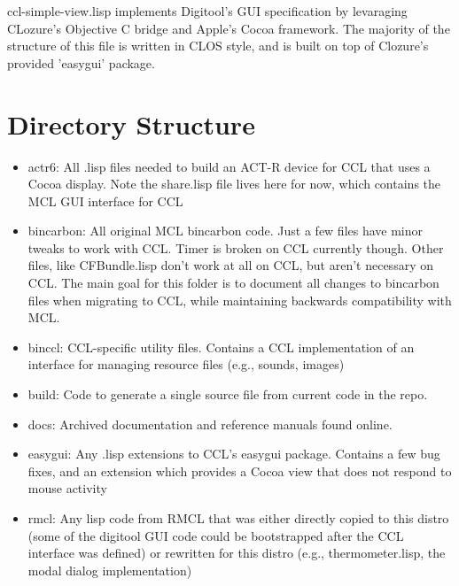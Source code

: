 \documentclass[12pt]{article} %
\begin{document}
ccl-simple-view.lisp implements Digitool's GUI specification by levaraging CLozure's Objective C bridge and Apple's Cocoa framework. The majority of the structure of this file is written in CLOS style, and is built on top of Clozure's provided 'easygui' package. 


\section{Directory Structure} %

\begin{itemize}

\item actr6: All .lisp files needed to build an ACT-R device for CCL that uses a Cocoa display. Note the share.lisp file lives here for now, which contains the MCL GUI interface for CCL

\item bincarbon: All original MCL bincarbon code. Just a few files have minor tweaks to work with CCL. Timer is broken on CCL currently though. Other files, like CFBundle.lisp don't work at all on CCL, but aren't necessary on CCL. The main goal for this folder is to document all changes to bincarbon files when migrating to CCL, while maintaining backwards compatibility with MCL.

\item binccl: CCL-specific utility files. Contains a CCL implementation of an interface for managing resource files (e.g., sounds, images)

\item build: Code to generate a single source file from current code in the repo.

\item docs: Archived documentation and reference manuals found online.

\item easygui: Any .lisp extensions to CCL's easygui package. Contains a few bug fixes, and an extension which provides a Cocoa view that does not respond to mouse activity	
\item rmcl: Any lisp code from RMCL that was either directly copied to this distro (some of the digitool GUI code could be bootstrapped after the CCL interface was defined) or rewritten for this distro (e.g., thermometer.lisp, the modal dialog implementation)


\end{itemize}
\end{document}
